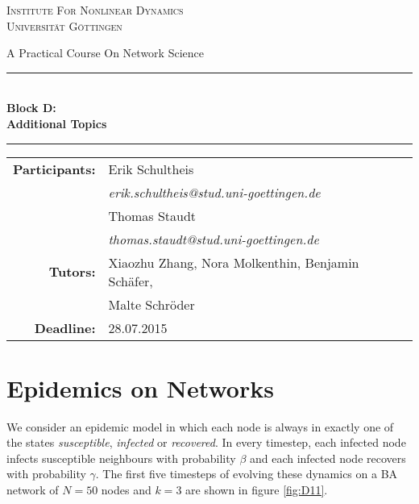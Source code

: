 \documentclass{scrartcl}
\begin{document}
\begin{titlepage}\centering
\textsc{\Large Institute For Nonlinear Dynamics \\[1.5ex] Universität Göttingen}

\vspace*{2cm}
{\huge A Practical Course On Network Science}
\vspace*{2cm}

\rule{\textwidth}{1pt}\\[0.5cm]
{\bfseries \huge Block D: \\[0.5cm] \huge \bfseries Additional Topics\\[0.5cm]}
\rule{\textwidth}{1pt}

\vspace*{4cm}

\begin{Large}\begin{tabular}{rl}
        \textbf{Participants:}  & Erik Schultheis                                \\    
                   & \textit{erik.schultheis@stud.uni-goettingen.de}\\[0.5cm]
                   & Thomas Staudt                                  \\
                   & \textit{thomas.staudt@stud.uni-goettingen.de}  \\[1.0cm]

       \textbf{Tutors:}        & Xiaozhu Zhang, Nora Molkenthin, Benjamin Schäfer, \\
                               & Malte Schröder                                    \\[1.0cm]
       \textbf{Deadline:}      & 28.07.2015
\end{tabular}\end{Large}

\vspace*{1.5cm}


\end{titlepage}

\tableofcontents
\clearpage

\section{Epidemics on Networks}
\label{sec:eponnet}
We consider an epidemic model in which each node is always in exactly one of the states \emph{susceptible}, \emph{infected} or \emph{recovered}. 
In every timestep, each infected node infects susceptible neighbours with probability $\beta$ and each infected node recovers with probability $\gamma$. 
The first five timesteps of evolving these dynamics on a BA network of $N=50$ nodes and $k=3$ are shown in figure \ref{fig:D11}.
\end{document}
